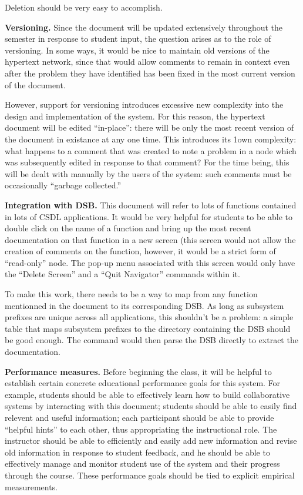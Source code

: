 \begin{itemizenoindent}
  Deletion should be very easy to accomplish. 
  
\item {\bf Versioning.} Since the document will be updated extensively
  throughout the semester in response to student input, the question arises
  as to the role of versioning.  In some ways, it would be nice to maintain
  old versions of the hypertext network, since that would allow comments to
  remain in context even after the problem they have identified has been
  fixed in the most current version of the document.
  
  However, support for versioning introduces excessive new complexity into
  the design and implementation of the system. For this reason, the hypertext
  document will be edited ``in-place'': there will be only the most recent
  version of the document in existance at any one time.  This introduces its
  1own complexity: what happens to a comment that was created to note a
  problem in a node which was subsequently edited in response to that
  comment?  For the time being, this will be dealt with manually by the users
  of the system: such comments must be occasionally ``garbage collected.''

  
\item {\bf Integration with DSB.} This document will refer to lots of
  functions contained in lots of CSDL applications.  It would be very helpful
  for students to be able to double click on the name of a function and
  bring up the most recent documentation on that function in a new screen
  (this screen would not allow the creation of comments on the function,
  however, it would be a strict form of ``read-only'' node.  The pop-up
  menu associated with this screen would only have the ``Delete Screen'' and
  a ``Quit Navigator'' commands within it.  

  To make this work, there needs to be a way to map from any function
  mentionned in the document to its corresponding DSB.  As long as
  subsystem prefixes are unique across all applications, this shouldn't be
  a problem: a simple table that maps subsystem prefixes to the directory
  containing the DSB should be good enough.  The command would then parse
  the DSB directly to extract the documentation. 
  
\item {\bf Performance measures.} Before beginning the class, it will be
  helpful to establish certain concrete educational performance goals for
  this system.  For example, students should be able to effectively learn how
  to build collaborative systems by interacting with this document; students
  should be able to easily find relevent and useful information; each
  participant should be able to provide ``helpful hints'' to each other, thus
  appropriating the instructional role.  The instructor should be able to
  efficiently and easily add new information and revise old information in
  response to student feedback, and he should be able to effectively manage
  and monitor student use of the system and their progress through the
  course.  These performance goals should be tied to explicit empirical
  measurements.
  

\end{itemizenoindent}
